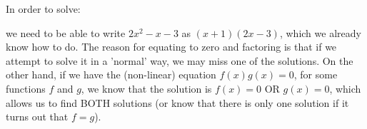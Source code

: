       
      \label{m39247*id149552}In order to solve:\par 
      \label{m39247*id149557}\nopagebreak\noindent{}
    
      
      \label{m39247*id149590}we need to be able to write \begin{math}2{x}^{2}-x-3\end{math} as \begin{math}\left(x+1\right)\left(2x-3\right)\end{math}, which we already know
how to do. The reason for equating to zero and factoring is that if we attempt to solve it in a 'normal' way, we may miss one of the solutions. On the other hand, if we have the (non-linear) equation \begin{math}f\left(x\right)g\left(x\right)=0\end{math}, for some functions \begin{math}f\end{math} and \begin{math}g\end{math}, we know that the solution is \begin{math}f\left(x\right)=0\end{math} OR \begin{math}g\left(x\right)=0\end{math}, which allows us to find BOTH solutions (or know that there is only one solution if it turns out that \begin{math}f=g\end{math}).\par 
\label{m39247*secfhsst!!!underscore!!!id2031}
